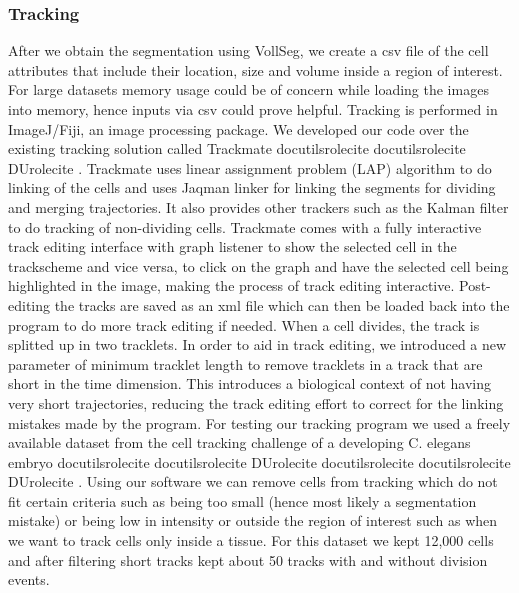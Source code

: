 \documentclass[letterpaper,compsoc,twoside,onecolumn]{IEEEtran}
\providecommand*{\DUrole}[2]{%
  \ifcsname docutilsrole#1\endcsname%
    \csname docutilsrole#1\endcsname{#2}%
  \else
    \csname DUrole#1\endcsname{#2}%
  \fi%
}
\begin{document}
\subsubsection{Tracking%
  \label{tracking}%
}
After we obtain the segmentation using VollSeg, we create a csv file of the cell attributes that include their location, size and volume inside a region of interest. For large datasets memory usage could be of concern while loading the images into memory, hence inputs via csv could prove helpful. Tracking is performed in ImageJ/Fiji, an image processing package. We developed our code over the existing tracking solution called Trackmate \DUrole{cite}{Tinevez2017}. Trackmate uses linear assignment  problem (LAP) algorithm to do linking of the cells and uses Jaqman linker for linking the segments for dividing and merging trajectories. It also provides other trackers such as the Kalman filter to do tracking of non-dividing cells. Trackmate comes with a fully interactive track editing interface with graph listener to show the selected cell in the trackscheme and vice versa, to click on the graph and have the selected cell being highlighted in the image, making the process of track editing interactive. Post-editing the tracks are saved as an xml file which can then be loaded back into the program to do more track editing if needed. When a cell divides, the track is splitted up in two tracklets. In order to aid in track editing, we introduced a new parameter of minimum tracklet length to remove tracklets in a track that are short in the time dimension. This introduces a biological context of not having very short trajectories, reducing the track editing effort to correct for the linking mistakes made by the program. For testing our tracking program we used a freely available dataset from the cell tracking challenge of a developing C. elegans embryo \DUrole{cite}{Celegans} \DUrole{cite}{Murray2008}. Using our software we can remove cells from tracking which do not fit certain criteria such as being too small (hence most likely a segmentation mistake) or being low in intensity or outside the region of interest such as when we want to track cells only inside a tissue. For this dataset we kept 12,000 cells and after filtering short tracks kept about 50 tracks with and without division events.
\end{document}
